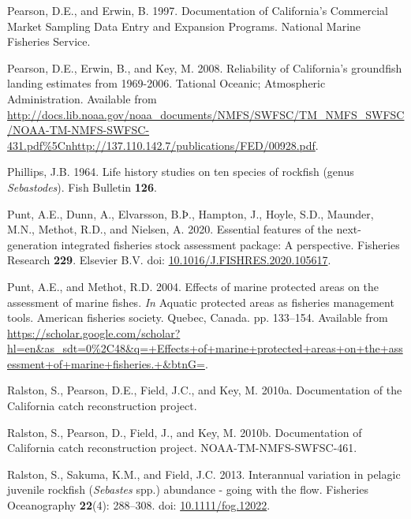 \documentclass[
  english,
  a4paper,
]{article}
\newlength{\cslhangindent}
\newlength{\cslentryspacingunit} %
\newenvironment{CSLReferences}[2] %
 {%
  \setlength{\parindent}{0pt}
  \ifodd #1
  \let\oldpar\par
  \def\par{\hangindent=\cslhangindent\oldpar}
  \fi
  \setlength{\parskip}{#2\cslentryspacingunit}
 }%
 {}
\begin{document}
\begin{CSLReferences}{1}{0}
\leavevmode{}%
Pearson, D.E., and Erwin, B. 1997. {Documentation of California's Commercial Market Sampling Data Entry and Expansion Programs}. National Marine Fisheries Service.

\leavevmode{}%
Pearson, D.E., Erwin, B., and Key, M. 2008. {Reliability of California's groundfish landing estimates from 1969-2006}. Tational Oceanic; Atmospheric Administration. Available from \url{http://docs.lib.noaa.gov/noaa_documents/NMFS/SWFSC/TM_NMFS_SWFSC/NOAA-TM-NMFS-SWFSC-431.pdf\%5Cnhttp://137.110.142.7/publications/FED/00928.pdf}.

\leavevmode{}%
Phillips, J.B. 1964. {Life history studies on ten species of rockfish (genus \emph{Sebastodes})}. Fish Bulletin \textbf{126}.

\leavevmode{}%
Punt, A.E., Dunn, A., Elvarsson, B.Þ., Hampton, J., Hoyle, S.D., Maunder, M.N., Methot, R.D., and Nielsen, A. 2020. {Essential features of the next-generation integrated fisheries stock assessment package: A perspective}. Fisheries Research \textbf{229}. Elsevier B.V. doi: \href{https://doi.org/10.1016/J.FISHRES.2020.105617}{10.1016/J.FISHRES.2020.105617}.

\leavevmode{}%
Punt, A.E., and Methot, R.D. 2004. {Effects of marine protected areas on the assessment of marine fishes}. \emph{In} Aquatic protected areas as fisheries management tools. American fisheries society. Quebec, Canada. pp. 133--154. Available from \url{https://scholar.google.com/scholar?hl=en\&as_sdt=0\%2C48\&q=+Effects+of+marine+protected+areas+on+the+assessment+of+marine+fisheries.+\&btnG=}.

\leavevmode{}%
Ralston, S., Pearson, D.E., Field, J.C., and Key, M. 2010a. {Documentation of the California catch reconstruction project}.

\leavevmode{}%
Ralston, S., Pearson, D., Field, J., and Key, M. 2010b. {Documentation of California catch reconstruction project.} NOAA-TM-NMFS-SWFSC-461.

\leavevmode{}%
Ralston, S., Sakuma, K.M., and Field, J.C. 2013. {Interannual variation in pelagic juvenile rockfish (\emph{Sebastes} spp.) abundance - going with the flow}. Fisheries Oceanography \textbf{22}(4): 288--308. doi: \href{https://doi.org/10.1111/fog.12022}{10.1111/fog.12022}.


\end{CSLReferences}
\end{document}
